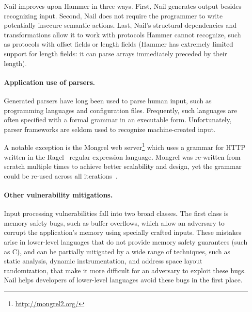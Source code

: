 Nail improves upon Hammer in three ways. First, Nail  generates output besides recognizing input.
Second, Nail does not require the programmer to write potentially insecure semantic actions. Last,
Nail's structural dependencies and transformations allow it to work with protocols Hammer cannot recognize, such as
protocols with offset fields or length fields (Hammer has extremely limited support for length
fields: it can parse arrays immediately preceded by their length).


\paragraph{Application use of parsers.}
Generated parsers have long been used to parse human input, such as programming languages and
configuration files. Frequently, such languages are often specified with a formal grammar in an
executable form. Unfortunately,  parser frameworks are seldom used  to recognize
machine-created input.

A notable exception is the Mongrel
web server\footnote{\url{http://mongrel2.org/}} which uses a grammar
for HTTP written in the Ragel~\cite{ragel-paper} regular expression
language. Mongrel was re-written from scratch multiple times to achieve
better scalability and design, yet the grammar could be  re-used across
all iterations~\cite{patterson-citation}.

\paragraph{Other vulnerability mitigations.}

Input processing vulnerabilities fall into two broad classes.  The first
class is memory safety bugs, such as buffer overflows, which allow an
adversary to corrupt the application's memory using specially crafted
inputs.  These mistakes arise in lower-level languages that do not
provide memory safety guarantees (such as C), and can be partially
mitigated by a wide range of techniques, such as static analysis,
dynamic instrumentation, and address space layout randomization, that
make it more difficult for an adversary to exploit these bugs.
Nail helps developers of lower-level languages avoid these bugs
in the first place.

